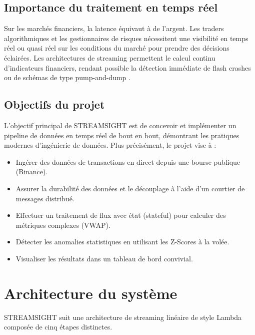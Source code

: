\documentclass[12pt, a4paper]{article}
\begin{document}
\subsection{Importance du traitement en temps r\'eel}
Sur les march\'es financiers, la latence \'equivaut \`a de l'argent. Les traders algorithmiques et les gestionnaires de risques n\'ecessitent une visibilit\'e en temps r\'eel ou quasi r\'eel sur les conditions du march\'e pour prendre des d\'ecisions \'eclair\'ees. Les architectures de streaming permettent le calcul continu d'indicateurs financiers, rendant possible la d\'etection imm\'ediate de \og flash crashes \fg{} ou de sch\'emas de type \og pump-and-dump \fg{}.

\subsection{Objectifs du projet}
L'objectif principal de STREAMSIGHT est de concevoir et impl\'ementer un pipeline de donn\'ees en temps r\'eel de bout en bout, d\'emontrant les pratiques modernes d'ing\'enierie de donn\'ees. Plus pr\'ecis\'ement, le projet vise \`a :
\begin{itemize}
    \item Ing\'erer des donn\'ees de transactions en direct depuis une bourse publique (Binance).
    \item Assurer la durabilit\'e des donn\'ees et le d\'ecouplage \`a l'aide d'un courtier de messages distribu\'e.
    \item Effectuer un traitement de flux avec \'etat (stateful) pour calculer des m\'etriques complexes (VWAP).
    \item D\'etecter les anomalies statistiques en utilisant les Z-Scores \`a la vol\'ee.
    \item Visualiser les r\'esultats dans un tableau de bord convivial.
\end{itemize}

\section{Architecture du syst\`eme}

STREAMSIGHT suit une architecture de streaming lin\'eaire de style Lambda compos\'ee de cinq \'etapes distinctes.
\end{document}
